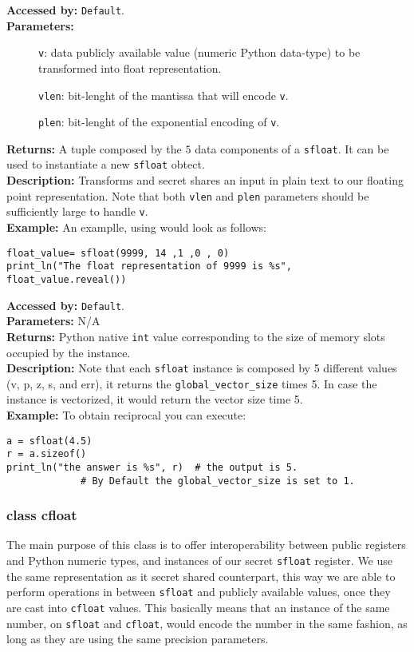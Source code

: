 \textbf{Accessed by:} \verb|Default|. \\
\textbf{Parameters:}
\begin{description}
  \item[]\verb|v|: data publicly available value (numeric Python data-type) to be transformed into float representation.
  \item[]\verb|vlen|: bit-lenght of the mantissa that will encode \verb|v|.
  \item[]\verb|plen|: bit-lenght of the exponential encoding of \verb|v|.
\end{description}
\textbf{Returns:} A tuple composed by the $5$ data components of a \verb|sfloat|.
It can be used to instantiate a new \verb|sfloat| obtect.\\
\textbf{Description:} Transforms and secret shares an input
in plain text to our floating point representation.
Note that both \verb|vlen| and \verb|plen| parameters should
be sufficiently large to handle \verb|v|.\\
\textbf{Example:}
An examplle, using  would look as follows:
\begin{lstlisting}
float_value= sfloat(9999, 14 ,1 ,0 , 0)
print_ln("The float representation of 9999 is %s", float_value.reveal())
\end{lstlisting}
\textbf{Accessed by:} \verb|Default|. \\
\textbf{Parameters:} N/A \\
\textbf{Returns:}
Python native \verb|int| value corresponding to the size of
memory slots occupied by the instance. \\
\textbf{Description:}
Note that each \verb|sfloat| instance is composed by 5
different values (v, p, z, s, and err),
it returns the \verb|global_vector_size| times 5.
In case the instance is vectorized,
it would return the vector size time 5.\\
\textbf{Example:}
To obtain reciprocal you can execute:
\begin{lstlisting}
a = sfloat(4.5)
r = a.sizeof()
print_ln("the answer is %s", r)  # the output is 5.
			 # By Default the global_vector_size is set to 1.
\end{lstlisting}

\subsubsection{class cfloat}
The main purpose of this class is to offer interoperability between public registers
and Python numeric types, and instances of our secret \verb|sfloat| register.
We use the same representation as it secret shared counterpart,
this way we are able to perform operations in between \verb|sfloat| and publicly available values,
once they are cast into \verb|cfloat| values.
This basically means that an instance of the same number, on \verb|sfloat| and \verb|cfloat|,
would  encode the number in the same fashion,
as long as they are using the same precision parameters.

